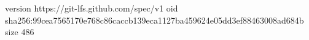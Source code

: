 version https://git-lfs.github.com/spec/v1
oid sha256:99cea7565170e768c86caccb139eca1127ba459624e05dd3ef88463008ad684b
size 486
